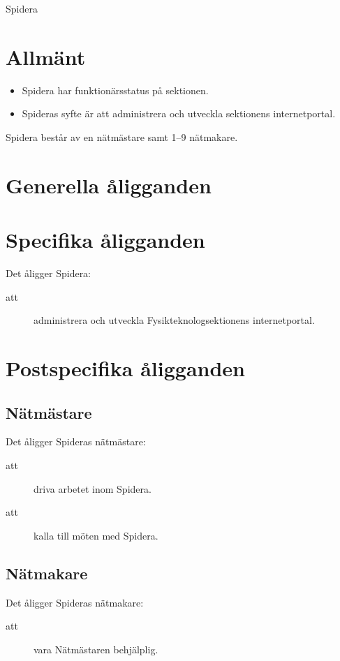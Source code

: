 \documentclass[a4paper]{article}
\begin{document}
\renewcommand{\forening}{Spidera} %

\begin{foreningenv}{\forening{}} %
    \section{Allmänt}
    \begin{itemize}
        \item Spidera har funktionärsstatus på sektionen.
        \item Spideras syfte är att administrera och utveckla sektionens internetportal.
    \end{itemize}
    Spidera består av en nätmästare samt 1--9 nätmakare. 
    
    \section{Generella åligganden}
    \aliggsektfunkt{}
    
    \section{Specifika åligganden}
    Det åligger \forening{}:
    \begin{description}
        \item[att] administrera och utveckla Fysikteknologsektionens internetportal.
    \end{description}
    
    \section{Postspecifika åligganden}
    \subsection{Nätmästare}
    Det åligger Spideras nätmästare:
    \begin{description}
          \item[att] driva arbetet inom Spidera.
          \item[att] kalla till möten med Spidera.
    \end{description}
    
    \subsection{Nätmakare}
    Det åligger Spideras nätmakare:
    \begin{description}
      \item[att] vara Nätmästaren behjälplig.
    \end{description}
\end{foreningenv}
\end{document}
